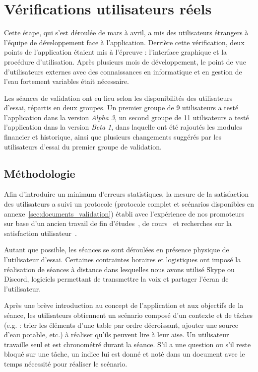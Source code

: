 \documentclass{EPL-master-thesis-covers-FR}
\begin{document}
		\section{Vérifications utilisateurs réels}


			Cette étape, qui s'est déroulée de mars à avril, a mis des utilisateurs étrangers à l'équipe de développement face à l'application. Derrière cette vérification, deux points de l'application étaient mis à l'épreuve : l'interface graphique et la procédure d'utilisation. Après plusieurs mois de développement, le point de vue d'utilisateurs externes avec des connaissances en informatique et en gestion de l'eau fortement variables était nécessaire.

			Les séances de validation ont eu lieu selon les disponibilités des utilisateurs d'essai, répartis en deux groupes. Un premier groupe de 9 utilisateurs a testé l'application dans la version \emph{Alpha 3}, un second groupe de 11 utilisateurs a testé l'application dans la version \emph{Beta 1}, dans laquelle  ont été rajoutés les modules financier et historique, ainsi que plusieurs changements suggérés par les utilisateurs d'essai du premier groupe de validation.

			\subsection*{Méthodologie}

				Afin d'introduire un minimum d'erreurs statistiques, la mesure de la satisfaction des utilisateurs a suivi un protocole (protocole complet et scénarios disponibles en annexe~\ref{sec:documents_validation}) établi avec l'expérience de nos promoteurs sur base d'un ancien travail de fin d'études~\cite{ref:reflecton}, de cours~\cite{ref:vanderdonckt_hci, ref:vanderdonckt_cscw} et recherches sur la satisfaction utilisateur~\cite{ref:usability_evaluation_tools, ref:ssi}.

				Autant que possible, les séances se sont déroulées en présence physique de l'utilisateur d'essai. Certaines contraintes horaires et logistiques ont imposé la réalisation de séances à distance dans lesquelles nous avons utilisé Skype ou Discord, logiciels permettant de transmettre la voix et partager l'écran de l'utilisateur.

				Après une brève introduction au concept de l'application et aux objectifs de la séance, les utilisateurs obtiennent un scénario composé d'un contexte et de tâches (e.g. : trier les éléments d'une table par ordre décroissant, ajouter une source d'eau potable, etc.) à réaliser qu'ils peuvent lire à leur aise. Un utilisateur travaille seul et est chronométré durant la séance. S'il a une question ou s'il reste bloqué sur une tâche, un indice lui est donné et noté dans un document avec le temps nécessité pour réaliser le scénario.
\end{document}

